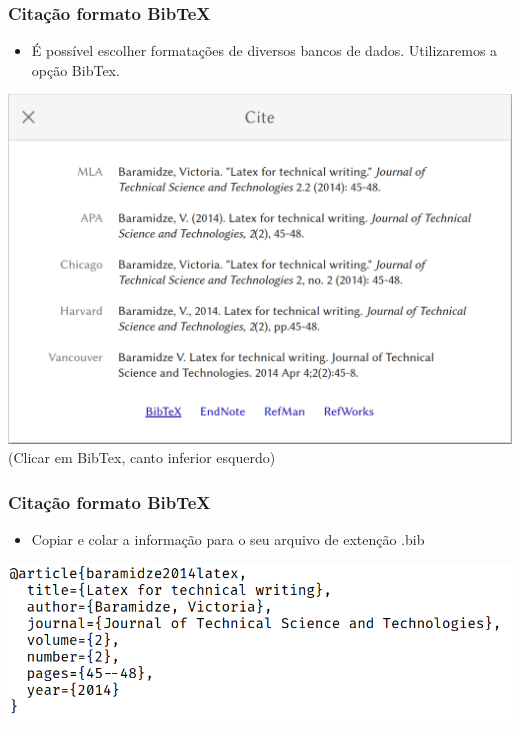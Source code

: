 \documentclass{beamer}
\begin{document}
\begin{frame}

  \frametitle{Citação formato BibTeX}

  \begin{itemize}
  \item É possível escolher formatações de diversos bancos de
    dados. Utilizaremos a opção BibTex.
  \end{itemize}


  \begin{center}
    \includegraphics[scale=0.15]{../Imagens/A2I103.png}
    (Clicar em BibTex, canto inferior esquerdo)
  \end{center}


\end{frame}

\begin{frame}

  \frametitle{Citação formato BibTeX}

  \begin{itemize}
  \item Copiar e colar a informação para o seu arquivo de extenção .bib
  \end{itemize}


  \begin{center}
    \includegraphics[scale=0.30]{../Imagens/A2I104.png}
  \end{center}


\end{frame}
\end{document}
